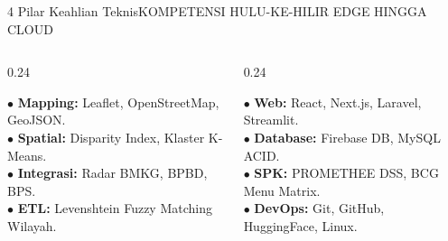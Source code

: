\documentclass[aspectratio=169,11pt]{beamer}
\begin{document}
\begin{frame}{4 Pilar Keahlian Teknis}{KOMPETENSI HULU-KE-HILIR EDGE HINGGA CLOUD}
\begin{columns}[t]
    \begin{column}{0.24\textwidth}
      \begin{tcolorbox}[colback=brandCardBg,colframe=brandBorder,arc=2mm,boxrule=0.6pt,boxsep=2pt,top=3pt,bottom=3pt,title={\scriptsize \bfseries \color{brandNavy} 3. Geospatial}]
        {\tiny \color{brandDark}
        $\bullet$ \textbf{Mapping:} Leaflet, OpenStreetMap, GeoJSON. \\ \vspace{2pt}
        $\bullet$ \textbf{Spatial:} Disparity Index, Klaster K-Means. \\ \vspace{2pt}
        $\bullet$ \textbf{Integrasi:} Radar BMKG, BPBD, BPS. \\ \vspace{2pt}
        $\bullet$ \textbf{ETL:} Levenshtein Fuzzy Matching Wilayah.
        }
      \end{tcolorbox}
    \end{column}

    \begin{column}{0.24\textwidth}
      \begin{tcolorbox}[colback=brandCardBg,colframe=brandBorder,arc=2mm,boxrule=0.6pt,boxsep=2pt,top=3pt,bottom=3pt,title={\scriptsize \bfseries \color{brandNavy} 4. Full-Stack}]
        {\tiny \color{brandDark}
        $\bullet$ \textbf{Web:} React, Next.js, Laravel, Streamlit. \\ \vspace{2pt}
        $\bullet$ \textbf{Database:} Firebase DB, MySQL ACID. \\ \vspace{2pt}
        $\bullet$ \textbf{SPK:} PROMETHEE DSS, BCG Menu Matrix. \\ \vspace{2pt}
        $\bullet$ \textbf{DevOps:} Git, GitHub, HuggingFace, Linux.
        }
      \end{tcolorbox}
    \end{column}
  \end{columns}
\end{frame}
\end{document}
